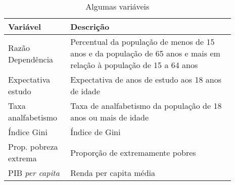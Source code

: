 \begin{table}[H]
    \centering
    \caption{Algumas variáveis}

    \begin{tabular}{m{0.23\linewidth}|m{0.66\linewidth}}
        Variável & Descrição \\

        \hline
        Razão Dependência & Percentual da população de menos de 15 anos e da população de 65 anos e mais em relação à população de 15 a 64 anos \\

        Expectativa estudo & Expectativa de anos de estudo aos 18 anos de idade \\

        Taxa analfabetismo & Taxa de analfabetismo da população de 18 anos ou mais de idade \\

        \hline
        Índice Gini & Índice de Gini \\

        \hline
        Prop. pobreza extrema & Proporção de extremamente pobres \\

        \hline
        PIB \textit{per capita} & Renda per capita média
    \end{tabular}

    \label{tab_variaveis-psm}
\end{table}